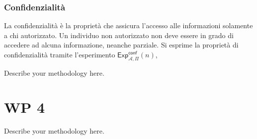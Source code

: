 \documentclass[a4paper,12pt]{article}
\begin{document}
\subsubsection{Confidenzialità}
La confidenzialità è la proprietà che assicura l'accesso alle informazioni solamente a chi autorizzato. Un individuo non autorizzato non deve essere in grado di accedere ad alcuna informazione, neanche parziale. 
\newline Si esprime la proprietà di confidenzialità tramite l'esperimento $\mathsf{Exp}_{\mathcal A,\Pi}^\mathsf{conf}(n)$,

Describe your methodology here.
\newpage
\section{WP 4}
Describe your methodology here.
\end{document}
